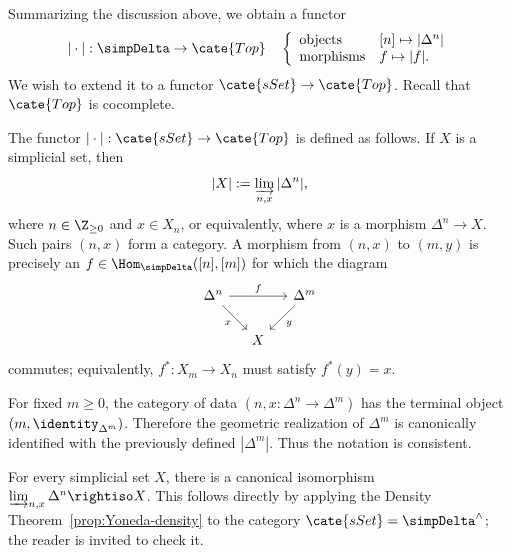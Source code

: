 Summarizing the discussion above, we obtain a functor
\begin{equation*}
	|\cdot|: \simpDelta \to \cate{Top} \quad
	\left\{\begin{array}{ll}
		\text{objects} & [n] \mapsto |\Delta^n| \\
		\text{morphisms} & f \mapsto |f| .
	\end{array}\right.
\end{equation*}
We wish to extend it to a functor $\cate{sSet}\to\cate{Top}$. Recall that
$\cate{Top}$ is cocomplete.

\begin{definition}
	The functor $|\cdot|:\cate{sSet}\to\cate{Top}$ is defined as follows. If
	$X$ is a simplicial set, then
	\[ |X| := \varinjlim_{n, x} |\Delta^n|, \]
	where $n\in\Z_{\geq0}$ and $x\in X_n$, or equivalently, where $x$ is a
	morphism $\Delta^n\to X$. Such pairs $(n,x)$ form a category. A morphism
	from $(n,x)$ to $(m,y)$ is precisely an
	$f\in\Hom_{\simpDelta}([n],[m])$ for which the diagram
	\[\begin{tikzcd}[column sep=small]
		\Delta^n \arrow[rr, "f"] \arrow[rd, "x"'] & & \Delta^m \arrow[ld, "y"] \\
		& X &
	\end{tikzcd}\]
	commutes; equivalently, $f^*:X_m\to X_n$ must satisfy $f^*(y)=x$.
\end{definition}

For fixed $m\geq0$, the category of data
$(n,x:\Delta^n\to\Delta^m)$ has the terminal object
$(m,\identity_{\Delta^m})$. Therefore the geometric realization of
$\Delta^m$ is canonically identified with the previously defined
$|\Delta^m|$. Thus the notation is consistent.

\begin{remark}\label{rem:simplicial-density}
	For every simplicial set $X$, there is a canonical isomorphism
	$\varinjlim_{n,x}\Delta^n\rightiso X$. This follows directly by applying
	the Density Theorem~\ref{prop:Yoneda-density} to the category
	$\cate{sSet}=\simpDelta^{\wedge}$; the reader is invited to check it.
\end{remark}

